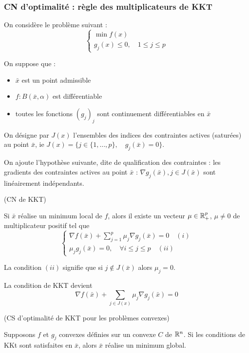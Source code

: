 	\subsubsection{CN d'optimalité : règle des multiplicateurs de KKT}
	
	On considère le problème suivant : \[ \begin{cases}\min f(x) \\ g_j(x) \leq 0 , \quad 1 \leq j \leq p \end{cases} \]
	
	On suppose que :
\begin{itemize}
	\item $\bar{x}$ est un point admissible
	\item $f:B(\bar{x},\alpha)$ est différentiable
	\item toutes les fonctions $(g_j)_j$ sont continuement différentiables en $\bar{x}$
\end{itemize}

On désigne par $J(x)$ l'ensembles des indices des contraintes actives (saturées) au point $\bar{x}$, ie $J(x) = \{ j \in \{ 1, \dots, p \}, \quad g_j(\bar{x}) = 0 \} $.

On ajoute l'hypothèse suivante, dite de qualification des contraintes : les gradients des contraintes actives au point $\bar{x}$ : $\nabla g_j(\bar{x}), {j\in J(\bar{x})}$ sont linéairement indépendants.

\begin{theoreme} (CN de KKT)
	
	Si $\bar{x}$ réalise un minimum local de $f$, alors il existe un vecteur $\mu \in \mathbb{R}_+^p$, $\mu \ne 0$ de multiplicateur positif tel que \[ \begin{cases} \displaystyle \nabla f(\bar{x}) + \sum_{j=1}^p \mu _j \nabla g_j (\bar{x}) = 0 \quad (i) \\ \mu _j g_j(\bar{x}) = 0, \quad \forall i \leq j \leq p \quad (ii) \end{cases} \]
	
\end{theoreme}

\begin{remarque}
La condition $(ii)$ signifie que si $j \not \in J(\bar{x})$ alors $\mu_j = 0$.

La condition de KKT devient \[ \nabla f(\bar{x}) + \sum_{j \in J(x)} \mu _j \nabla g_j (\bar{x}) = 0 \]
\end{remarque}

\begin{theoreme} (CS d'optimalité de KKT pour les problèmes convexes)

Supposons $f$ et $g_j$ convexes définies sur un convexe $C$ de $\mathbb{R}^n$. Si les conditions de KKt sont satisfaites en $\bar{x}$, alors $\bar{x}$ réalise un minimum global.
\end{theoreme}

